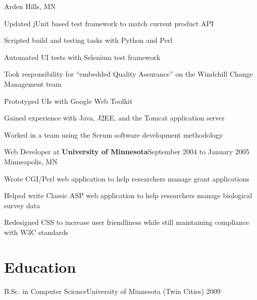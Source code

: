 \documentclass[letterpaper]{article}
\newenvironment{resume-list}
{\begin{itemize}
 \setlength{\itemsep}{0pt}
 \setlength{\parskip}{0pt}}
{\end{itemize}}
\begin{document}
Arden Hills, MN
\begin{resume-list}
\item Updated jUnit based test framework to match current product API
\item Scripted build and testing tasks with Python and Perl
\item Automated UI tests with Selenium test framework
\item Took responsibility for ``embedded Quality Assurance'' on the Windchill Change Management team
\item Prototyped UIs with Google Web Toolkit
\item Gained experience with Java, J2EE, and the Tomcat application server
\item Worked in a team using the Scrum software development methodology
\end{resume-list}
\noindent Web Developer at {\bfseries University of Minnesota}\dotfill September 2004 to January 2005\\
Minneapolis, MN
\begin{resume-list}
\item Wrote CGI/Perl web application to help researchers manage grant applications
\item Helped write Classic ASP web application to help researchers manage biological survey data
\item Redesigned CSS to increase user friendliness while still maintaining compliance with W3C standards
\end{resume-list}
\section*{Education}
\noindent B.Sc. in Computer Science\dotfill University of Minnesota (Twin Cities) 2009\\
\end{document}

